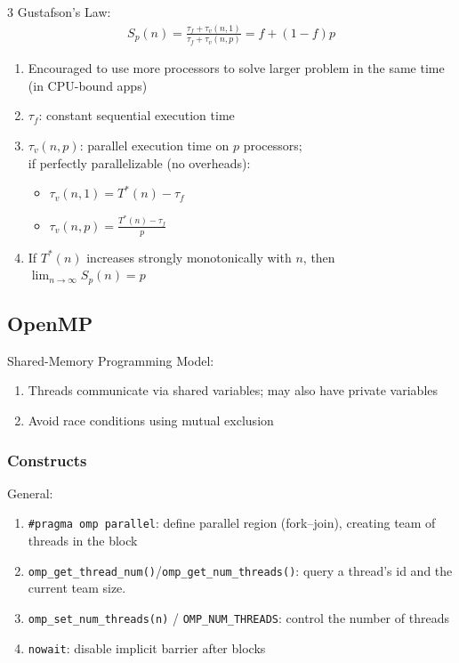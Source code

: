 \documentclass[12pt, a4paper]{article}
\begin{document}
\begin{multicols*}{3}
Gustafson's Law:
\begin{gather*}
  S_p(n) = \frac{\tau_f + \tau_v(n,1)}{\tau_f + \tau_v(n,p)} = f + (1-f)p
\end{gather*}
\begin{enumerate}[\roman*.]
  \item Encouraged to use more processors to solve larger problem in the same time (in CPU-bound apps)
  \item $\tau_f$: constant sequential execution time 
  \item $\tau_v(n,p)$: parallel execution time on $p$ processors;\\if perfectly parallelizable (no overheads):
    \begin{itemize}[leftmargin=*]\vspace{3pt}
      \item $\tau_v(n,1)=T^*(n)-\tau_f$
      \item $\tau_v(n,p)=\frac{T^*(n)-\tau_f}{p}$
    \end{itemize}
  \item If $T^*(n)$ increases strongly monotonically with $n$, then $\lim_{n\rightarrow\infty} S_p(n)=p$
\end{enumerate}

\subsection{OpenMP}
Shared-Memory Programming Model:
\begin{enumerate}[\roman*.]
  \item Threads communicate via shared variables; may also have private variables
  \item Avoid race conditions using mutual exclusion
\end{enumerate} 

\subsubsection{Constructs}
General:
\begin{enumerate}[\roman*.]
  \item \lstinline|#pragma omp parallel|: define parallel region (fork--join), creating team of threads in the block
  \item \lstinline|omp_get_thread_num()|/\lstinline|omp_get_num_threads()|: query a thread's id and the current team size.
  \item \lstinline|omp_set_num_threads(n)| / \lstinline|OMP_NUM_THREADS|: control the number of threads 
  \item \lstinline|nowait|: disable implicit barrier after blocks
\end{enumerate}


\end{multicols*}
\end{document}
